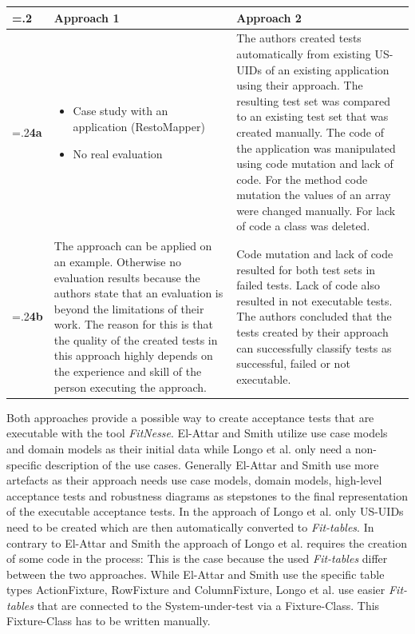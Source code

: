  \newpage
 \begin{tabularx}{\textwidth}{>{\hsize=.2\hsize}X|X|X}
  		 & \textbf{Approach 1} & \textbf{Approach 2} \\
  		\hline
  		 \textbf{4a} & \begin{itemize} \item Case study with an application (RestoMapper)
\item	No real evaluation \end{itemize}
 & The authors created tests automatically from existing US-UIDs of an existing application using their approach.
The resulting test set was compared to an existing test set that was created manually.
The code of the application was manipulated using code mutation and lack of code.
For the method code mutation the values of an array were changed manually. For lack of code a class was deleted.
 \\
  		 \textbf{4b} & The approach can be applied on an example.
Otherwise no evaluation results because the authors state that an evaluation is beyond the limitations of their work.
The reason for this is that the quality of the created tests in this approach highly depends on the experience and skill of the person executing the approach.

 & Code mutation and lack of code resulted for both test sets in failed tests.
Lack of code also resulted in not executable tests.
The authors concluded that the tests created by their approach can successfully classify tests as successful, failed or not executable.
 \\

 	\end{tabularx}
 	\renewcommand{\arraystretch}{1}

Both approaches provide a possible way to create acceptance tests that are executable with the tool \textit{FitNesse}.
El-Attar and Smith utilize use case models and domain models as their initial data while Longo et al. only need a non-specific description of the use cases.
Generally El-Attar and Smith use more artefacts as their approach needs use case models, domain models, high-level acceptance tests and robustness diagrams as stepstones to the final representation of the executable acceptance tests.
In the approach of Longo et al. only US-UIDs need to be created which are then automatically converted to \textit{Fit-tables}.
In contrary to El-Attar and Smith the approach of Longo et al. requires the creation of some code in the process:
This is the case because the used \textit{Fit-tables} differ between the two approaches.
While El-Attar and Smith use the specific table types ActionFixture, RowFixture and ColumnFixture, Longo et al. use easier \textit{Fit-tables} that are connected to the System-under-test via a Fixture-Class.
This Fixture-Class has to be written manually.

